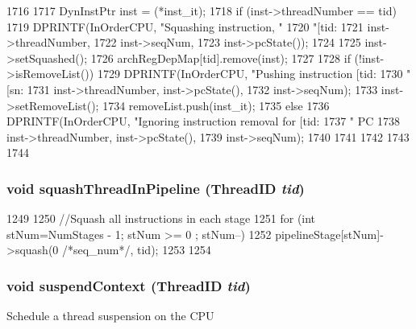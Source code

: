 \begin{DoxyCode}
1716 {
1717     DynInstPtr inst = (*inst_it);
1718     if (inst->threadNumber == tid) {
1719         DPRINTF(InOrderCPU, "Squashing instruction, "
1720                 "[tid:%
1721                 inst->threadNumber,
1722                 inst->seqNum,
1723                 inst->pcState());
1724 
1725         inst->setSquashed();
1726         archRegDepMap[tid].remove(inst);
1727 
1728         if (!inst->isRemoveList()) {
1729             DPRINTF(InOrderCPU, "Pushing instruction [tid:%
1730                     "[sn:%
1731                     inst->threadNumber, inst->pcState(),
1732                     inst->seqNum);
1733             inst->setRemoveList();
1734             removeList.push(inst_it);
1735         } else {
1736             DPRINTF(InOrderCPU, "Ignoring instruction removal for [tid:%
1737                     " PC %
1738                     inst->threadNumber, inst->pcState(),
1739                     inst->seqNum);
1740         }
1741     
1742     }
1743     
1744 }
\end{DoxyCode}
\hypertarget{classInOrderCPU_a53bed7b6c73f79636a1c6b918eb08f35}{
\subsubsection[{squashThreadInPipeline}]{\setlength{\rightskip}{0pt plus 5cm}void squashThreadInPipeline ({\bf ThreadID} {\em tid})}}
\label{classInOrderCPU_a53bed7b6c73f79636a1c6b918eb08f35}



\begin{DoxyCode}
1249 {
1250     //Squash all instructions in each stage
1251     for (int stNum=NumStages - 1; stNum >= 0 ; stNum--) {
1252         pipelineStage[stNum]->squash(0 /*seq_num*/, tid);
1253     }
1254 }
\end{DoxyCode}
\hypertarget{classInOrderCPU_aed2e2b9af515a66bdde61b85f150856a}{
\subsubsection[{suspendContext}]{\setlength{\rightskip}{0pt plus 5cm}void suspendContext ({\bf ThreadID} {\em tid})}}
\label{classInOrderCPU_aed2e2b9af515a66bdde61b85f150856a}
Schedule a thread suspension on the CPU 


